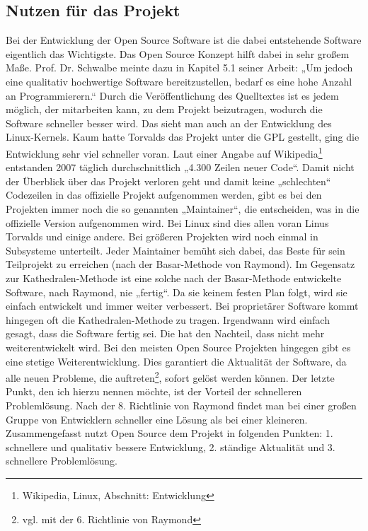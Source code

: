 \documentclass[a4paper,12pt]{article}
\begin{document}
\subsection{Nutzen für das Projekt}
Bei der Entwicklung der Open Source Software ist die dabei entstehende Software eigentlich das Wichtigste. Das Open Source Konzept hilft dabei in sehr großem Maße. Prof. Dr. Schwalbe meinte dazu in Kapitel 5.1 seiner Arbeit: „Um jedoch eine qualitativ hochwertige Software bereitzustellen, bedarf es eine hohe Anzahl an Programmierern.“ Durch die Veröffentlichung des Quelltextes ist es jedem möglich, der mitarbeiten kann, zu dem Projekt beizutragen, wodurch die Software schneller besser wird. Das sieht man auch an der Entwicklung des Linux-Kernels. Kaum hatte Torvalds das Projekt unter die GPL gestellt, ging die Entwicklung sehr viel schneller voran. Laut einer Angabe auf Wikipedia\footnote{Wikipedia, Linux, Abschnitt: Entwicklung} entstanden 2007 täglich durchschnittlich „4.300 Zeilen neuer Code“. Damit nicht der Überblick über das Projekt verloren geht und damit keine „schlechten“ Codezeilen in das offizielle Projekt aufgenommen werden, gibt es bei den Projekten immer noch die so genannten „Maintainer“, die entscheiden, was in die offizielle Version aufgenommen wird. Bei Linux sind dies allen voran Linus Torvalds und einige andere. Bei größeren Projekten wird noch einmal in Subsysteme unterteilt. Jeder Maintainer bemüht sich dabei, das Beste für sein Teilprojekt zu erreichen (nach der Basar-Methode von Raymond). Im Gegensatz zur Kathedralen-Methode ist eine solche nach der Basar-Methode entwickelte Software, nach Raymond, nie „fertig“. Da sie keinem festen Plan folgt, wird sie einfach entwickelt und immer weiter verbessert. Bei proprietärer Software kommt hingegen oft die Kathedralen-Methode zu tragen. Irgendwann wird einfach gesagt, dass die Software fertig sei. Die hat den Nachteil, dass nicht mehr weiterentwickelt wird. Bei den meisten Open Source Projekten hingegen gibt es eine stetige Weiterentwicklung. Dies garantiert die Aktualität der Software, da alle neuen Probleme, die auftreten\footnote{vgl. mit der 6. Richtlinie von Raymond}, sofort gelöst werden können. Der letzte Punkt, den ich hierzu nennen möchte, ist der Vorteil der schnelleren Problemlösung. Nach der 8. Richtlinie von Raymond findet man bei einer großen Gruppe von Entwicklern schneller eine Lösung als bei einer kleineren.
\\Zusammengefasst nutzt Open Source dem Projekt in folgenden Punkten: 1. schnellere und qualitativ bessere Entwicklung, 2. ständige Aktualität und 3. schnellere Problemlösung.
\end{document}
